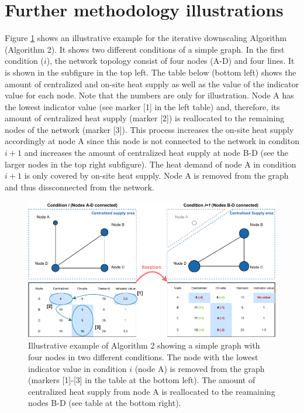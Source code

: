 \documentclass[review]{elsarticle}
\begin{document}
\section{Further methodology illustrations}\label{appendixB}
Figure \ref{fig:app:method} shows an illustrative example for the iterative downscaling Algorithm (Algorithm 2). It shows two different conditions of a simple graph. In the first condition ($i$), the network topology consist of four nodes (A-D) and four lines. It is shown in the subfigure in the top left. The table below (bottom left) shows the amount of centralized and on-site heat supply as well as the value of the indicator value for each node. Note that the numbers are only for illustration. Node A has the lowest indicator value (see marker [1] in the left table) and, therefore, its amount of centralized heat supply (marker [2]) is reallocated to the remaining nodes of the network (marker [3]). This process increases the on-site heat supply accordingly at node A since this node is not connected to the network in conditon $i+1$ and increases the amount of centralized heat supply at node B-D (see the larger nodes in the top right subfigure). The heat demand of node A in condition $i+1$ is only covered by on-site heat supply. Node A is removed from the graph and thus dissconnected from the network.

\begin{figure}[h]
	\centering
	\includegraphics[width=1\linewidth]{figures/_appendix/Method_appendix.pdf}
	\caption{Illustrative example of Algorithm 2 showing a simple graph with four nodes in two different conditions. The node with the lowest indicator value in condition $i$ (node A) is removed from the graph (markers [1]-[3] in the table at the bottom left). The amount of centralized heat supply from node A is reallocated to the reamaining nodes B-D (see table at the bottom right).}
	\label{fig:app:method}
\end{figure}
\end{document}
